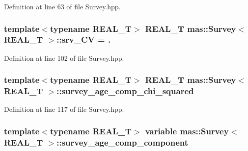 Definition at line 63 of file Survey.\-hpp.

\hypertarget{structmas_1_1_survey_aad907f4e8413369d6f747f575dca2c91}{
\subsubsection[{srv\-\_\-\-C\-V}]{\setlength{\rightskip}{0pt plus 5cm}template$<$typename R\-E\-A\-L\-\_\-\-T$>$ R\-E\-A\-L\-\_\-\-T {\bf mas\-::\-Survey}$<$ R\-E\-A\-L\-\_\-\-T $>$\-::srv\-\_\-\-C\-V = .}}\label{structmas_1_1_survey_aad907f4e8413369d6f747f575dca2c91}


Definition at line 102 of file Survey.\-hpp.

\hypertarget{structmas_1_1_survey_acd94359a531d576cfbbe7d5a1faab9f5}{
\subsubsection[{survey\-\_\-age\-\_\-comp\-\_\-chi\-\_\-squared}]{\setlength{\rightskip}{0pt plus 5cm}template$<$typename R\-E\-A\-L\-\_\-\-T$>$ R\-E\-A\-L\-\_\-\-T {\bf mas\-::\-Survey}$<$ R\-E\-A\-L\-\_\-\-T $>$\-::survey\-\_\-age\-\_\-comp\-\_\-chi\-\_\-squared}}\label{structmas_1_1_survey_acd94359a531d576cfbbe7d5a1faab9f5}


Definition at line 117 of file Survey.\-hpp.

\hypertarget{structmas_1_1_survey_afa960c2c4912f01084664b99fd9bf736}{
\subsubsection[{survey\-\_\-age\-\_\-comp\-\_\-component}]{\setlength{\rightskip}{0pt plus 5cm}template$<$typename R\-E\-A\-L\-\_\-\-T$>$ {\bf variable} {\bf mas\-::\-Survey}$<$ R\-E\-A\-L\-\_\-\-T $>$\-::survey\-\_\-age\-\_\-comp\-\_\-component}}\label{structmas_1_1_survey_afa960c2c4912f01084664b99fd9bf736}


